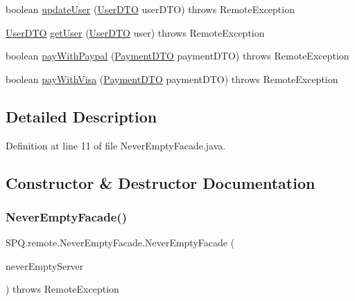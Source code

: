 \begin{DoxyCompactItemize}
boolean \mbox{\hyperlink{class_s_p_q_1_1remote_1_1_never_empty_facade_a55ad685d3c176424a7f5f18e5ebe043b}{update\+User}} (\mbox{\hyperlink{class_s_p_q_1_1dto_1_1_user_d_t_o}{User\+D\+TO}} user\+D\+TO)  throws Remote\+Exception 
\item 
\mbox{\hyperlink{class_s_p_q_1_1dto_1_1_user_d_t_o}{User\+D\+TO}} \mbox{\hyperlink{class_s_p_q_1_1remote_1_1_never_empty_facade_a32679a25e12c8a33e84087de357cd616}{get\+User}} (\mbox{\hyperlink{class_s_p_q_1_1dto_1_1_user_d_t_o}{User\+D\+TO}} user)  throws Remote\+Exception 
\item 
boolean \mbox{\hyperlink{class_s_p_q_1_1remote_1_1_never_empty_facade_a9942c7930b5144f0677dc0fdcde25cc3}{pay\+With\+Paypal}} (\mbox{\hyperlink{class_s_p_q_1_1dto_1_1_payment_d_t_o}{Payment\+D\+TO}} payment\+D\+TO)  throws Remote\+Exception 
\item 
boolean \mbox{\hyperlink{class_s_p_q_1_1remote_1_1_never_empty_facade_a0ff9201cf33cb76c43dd85c892af93ba}{pay\+With\+Visa}} (\mbox{\hyperlink{class_s_p_q_1_1dto_1_1_payment_d_t_o}{Payment\+D\+TO}} payment\+D\+TO)  throws Remote\+Exception 
\end{DoxyCompactItemize}


\subsection{Detailed Description}


Definition at line 11 of file Never\+Empty\+Facade.\+java.



\subsection{Constructor \& Destructor Documentation}
\mbox{\label{class_s_p_q_1_1remote_1_1_never_empty_facade_afc6e9b52fbed599fb3f152533d2bedea}} 
\subsubsection{\texorpdfstring{Never\+Empty\+Facade()}{NeverEmptyFacade()}}
{\footnotesize\ttfamily S\+P\+Q.\+remote.\+Never\+Empty\+Facade.\+Never\+Empty\+Facade (\begin{DoxyParamCaption}\item[{\mbox{\hyperlink{class_s_p_q_1_1_never_empty_server}{Never\+Empty\+Server}}}]{never\+Empty\+Server }\end{DoxyParamCaption}) throws Remote\+Exception}



